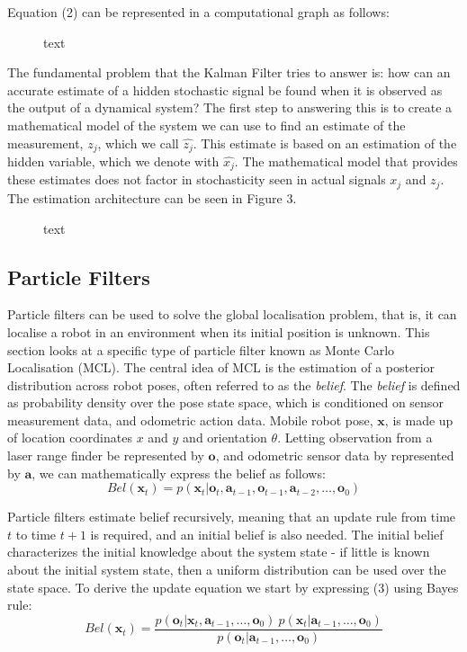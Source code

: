 \documentclass[a4paper]{article}
\begin{document}
Equation (2) can be represented in a computational graph as follows:
\begin{figure}[h]
\centering

\caption{text}
\end{figure}

The fundamental problem that the Kalman Filter tries to answer is: how can an accurate estimate of a hidden stochastic signal be found when it is observed as the output of a dynamical system? The first step to answering this is to create a mathematical model of the system we can use to find an estimate of the measurement, $z_j$, which we call $\hat{z_j}$. This estimate is based on an estimation of the hidden variable, which we denote with $\hat{x_j}$. The mathematical model that provides these estimates does not factor in stochasticity seen in actual signals $x_j$ and $z_j$. The estimation architecture can be seen in Figure 3.
\begin{figure}[h]
\centering

\caption{text}
\end{figure}

\subsection{Particle Filters}
Particle filters can be used to solve the global localisation problem, that is, it can localise a robot in an environment when its initial position is unknown. This section looks at a specific type of particle filter known as Monte Carlo Localisation (MCL). The central idea of MCL is the estimation of a posterior distribution across robot poses, often referred to as the \textit{belief}. The \textit{belief} is defined as probability density over the pose state space, which is conditioned on sensor measurement data, and odometric action data. Mobile robot pose, $\mathbf{x}$, is made up of location coordinates $x$ and $y$ and orientation $\theta$. Letting observation from a laser range finder be represented by $\mathbf{o}$, and odometric sensor data by represented by $\mathbf{a}$, we can mathematically express the belief as follows:
\begin{equation}
Bel(\mathbf{x}_t) = p(\mathbf{x}_t | \mathbf{o}_t, \mathbf{a}_{t-1}, \mathbf{o}_{t-1}, \mathbf{a}_{t-2},\ldots,\mathbf{o}_0)
\end{equation}

Particle filters estimate belief recursively, meaning that an update rule from time $t$ to time $t+1$ is required, and an initial belief is also needed. The initial belief characterizes the initial knowledge about the system state - if little is known about the initial system state, then a uniform distribution can be used over the state space. To derive the update equation we start by expressing (3) using Bayes rule:
\begin{equation}
Bel(\mathbf{x}_t) = \frac{p(\mathbf{o}_t | \mathbf{x}_t,\mathbf{a}_{t-1},\ldots,\mathbf{o}_0) \ p(\mathbf{x}_t | \mathbf{a}_{t-1},\ldots,\mathbf{o}_0)}{p(\mathbf{o}_t | \mathbf{a}_{t-1},\ldots,\mathbf{o}_0)}
\end{equation}
\end{document}
